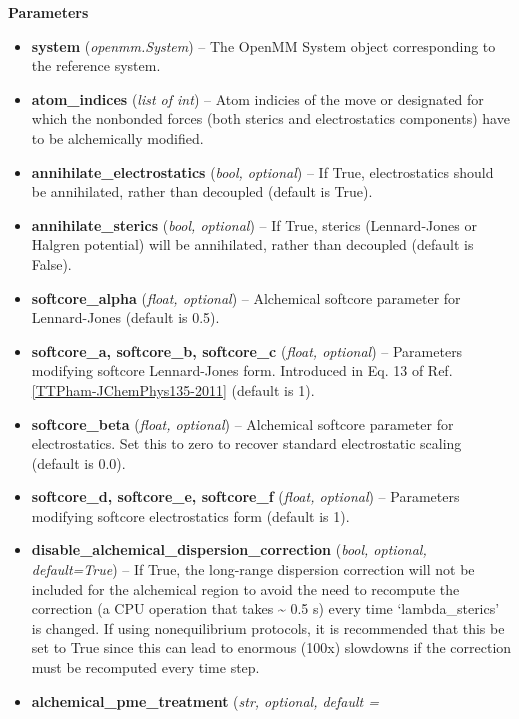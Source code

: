 \begin{description}
\begin{description}
\item
    \textbf{Parameters}
\begin{itemize}
\item
  \textbf{system} (\emph{openmm.System}) -- The OpenMM System object
  corresponding to the reference system.
\item
  \textbf{atom\_indices} (\emph{list of int}) -- Atom indicies of the
  move or designated for which the nonbonded forces (both sterics and
  electrostatics components) have to be alchemically modified.
\item
  \textbf{annihilate\_electrostatics} (\emph{bool, optional}) -- If
  True, electrostatics should be annihilated, rather than decoupled
  (default is True).
\item
  \textbf{annihilate\_sterics} (\emph{bool, optional}) -- If True,
  sterics (Lennard-Jones or Halgren potential) will be annihilated,
  rather than decoupled (default is False).
\item
  \textbf{softcore\_alpha} (\emph{float, optional}) -- Alchemical
  softcore parameter for Lennard-Jones (default is 0.5).
\item
  \textbf{softcore\_a, softcore\_b, softcore\_c} (\emph{float,
  optional}) -- Parameters modifying softcore Lennard-Jones form.
  Introduced in Eq. 13 of Ref.
  \protect\hyperlink{ttpham-jchemphys135-2011}{{{[}TTPham-JChemPhys135-2011{]}}}
  (default is 1).
\item
  \textbf{softcore\_beta} (\emph{float, optional}) -- Alchemical
  softcore parameter for electrostatics. Set this to zero to recover
  standard electrostatic scaling (default is 0.0).
\item
  \textbf{softcore\_d, softcore\_e, softcore\_f} (\emph{float,
  optional}) -- Parameters modifying softcore electrostatics form
  (default is 1).
\item
  \textbf{disable\_alchemical\_dispersion\_correction} (\emph{bool,
  optional, default=True}) -- If True, the long-range dispersion
  correction will not be included for the alchemical region to avoid the
  need to recompute the correction (a CPU operation that takes
  \textasciitilde{} 0.5 s) every time `lambda\_sterics' is changed. If
  using nonequilibrium protocols, it is recommended that this be set to
  True since this can lead to enormous (100x) slowdowns if the
  correction must be recomputed every time step.
\item
  \textbf{alchemical\_pme\_treatment} (\emph{str, optional, default =
}
\end{itemize}
\end{description}
\end{description}
